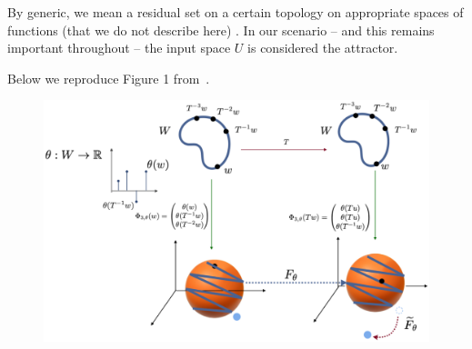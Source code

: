 By generic, we mean a residual set on a certain topology on appropriate spaces of functions (that we do not describe here) . 
In our scenario -- and this remains important throughout -- the input space $U$ is considered the attractor.~\label{attractor_U}

Below we reproduce Figure 1 from~\cite{Supp}.



\begin{figure}[ht]
  \includegraphics[width=0.7\linewidth]{Graphs/_takensmap.eps}
  \centering
 \label{fig:takensmap}
\end{figure}

